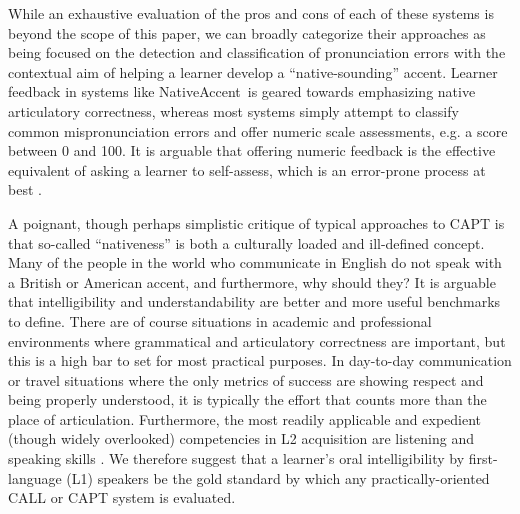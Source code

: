 While an exhaustive evaluation of the pros and cons of each of these systems is beyond the scope of this paper, we can broadly categorize their approaches as being focused on the detection and classification of pronunciation errors with the contextual aim of helping a learner develop a ``native-sounding'' accent. Learner feedback in systems like NativeAccent\textregistered \ is geared towards emphasizing native articulatory correctness, whereas most systems simply attempt to classify common mispronunciation errors and offer numeric scale assessments, e.g. a score between 0 and 100. It is arguable that offering numeric feedback is the effective equivalent of asking a learner to self-assess, which is an error-prone process at best \cite{eskenazi2007nativeaccenttm}.

A poignant, though perhaps simplistic critique of typical approaches to CAPT is that so-called ``nativeness'' is both a culturally loaded and ill-defined concept. Many of the people in the world who communicate in English do not speak with a British or American accent, and furthermore, why should they? It is arguable that intelligibility and understandability are better and more useful benchmarks to define. There are of course situations in academic and professional environments where grammatical and articulatory correctness are important, but this is a high bar to set for most practical purposes. In day-to-day communication or travel situations where the only metrics of success are showing respect and being properly understood, it is typically the effort that counts more than the place of articulation. Furthermore, the most readily applicable and expedient (though widely overlooked) competencies in L2 acquisition are listening and speaking skills \cite{brown1996performance} \cite{renukadevirole} \cite{feyten1991power} \cite{nunan2002listening} \cite{ferris1996academic}. We therefore suggest that a learner's oral intelligibility by first-language (L1) speakers be the gold standard by which any practically-oriented CALL or CAPT system is evaluated. 